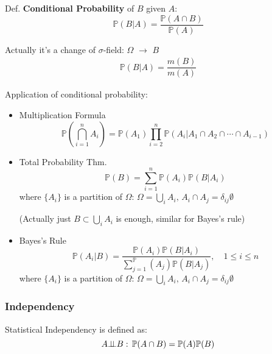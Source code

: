     Def. \textbf{Conditional Probability} of $B$ given $A$:
    \begin{equation}    
        \mathbb{P}(B|A)=\frac{\mathbb{P}(A\cap B)}{\mathbb{P}(A)}    
    \end{equation}

    Actually it's a change of $\sigma$-field: $\Omega$ $ \to $ $B$
    \begin{align}
        \mathbb{P}\left( B|A \right) = \dfrac{m(B)}{m(A)} 
    \end{align}


\begin{point}
    Application of conditional probability:
\end{point}

        \begin{itemize}
        \item Multiplication Formula
        \begin{equation}    
            \mathbb{P}(\bigcap_{i=1}^n A_i)=\mathbb{P}(A_1)\prod_{i=2}^n \mathbb{P}(A_i|A_1\cap A_2\cap \cdots\cap A_{i-1})    
        \end{equation}
        \item Total Probability Thm.
        \begin{equation}    
            \mathbb{P}(B)=\sum_{i=1}^n \mathbb{P}(A_i)\mathbb{P}(B|A_i)  
        \end{equation}
        where $\{A_i\}$ is a partition of $\Omega$: $ \Omega =\bigcup_{i}A_i ,\, A_i\cap A_j=\delta _{ij}\emptyset$

        (Actually just $ B\subset \bigcup_{i}A_i $ is enough, similar for Bayes's rule)
        \item Bayes's Rule
        \begin{equation}    
            \mathbb{P}(A_i|B)=\dfrac{\mathbb{P}(A_i)\mathbb{P}(B|A_i)}{\sum_{j=1}^\mathbb{P}(A_j)\mathbb{P}(B|A_j)}    ,\quad 1\leq i\leq n
        \end{equation}
        where $\{A_i\}$ is a partition of $\Omega$: $ \Omega =\bigcup_{i}A_i,\, A_i\cap A_j=\delta _{ij}\emptyset $
    \end{itemize}

\subsubsection{Independency}
    Statistical Independency is defined as:
    \begin{equation}    
        A\bot\!\!\!\bot B:\,\mathbb{P}(A\cap B) =\mathbb{P}(A)\mathbb{P}(B)
    \end{equation}

